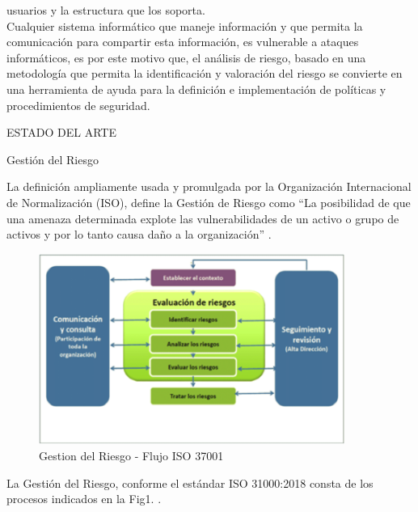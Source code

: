 \documentclass[a4paper,12pt]{article}
\begin{document}
usuarios y la estructura que los soporta.\\
Cualquier sistema informático que maneje información y que permita la comunicación 
para compartir esta información, es vulnerable a ataques informáticos, es por 
este motivo que, el análisis de riesgo, basado en una metodología que permita la identificación y valoración del riesgo se convierte en una herramienta 
de ayuda para la definición e implementación de políticas y procedimientos de 
seguridad.\\
\begin{bf}
\begin{center}
ESTADO DEL ARTE\\
\end{center}
\end{bf}
\begin{bf}   
Gestión del Riesgo\\
\end{bf}
La definición ampliamente usada y promulgada por la Organización Internacional de 
Normalización (ISO), define la Gestión de Riesgo como “La posibilidad de que una 
amenaza determinada explote las vulnerabilidades de un activo o grupo de activos y 
por lo tanto causa daño a la organización” \cite{Institute2009}.
\begin{figure}[h!]
\centering
\includegraphics[width=10cm]{Manejo_Riesgo_ISO-31000.png}
\caption{Gestion del Riesgo - Flujo ISO 37001}
\end{figure}
La Gestión del Riesgo, conforme el estándar ISO 31000:2018 consta de los procesos indicados en la 
Fig1. \cite{Grupo2018}.
\end{document}
